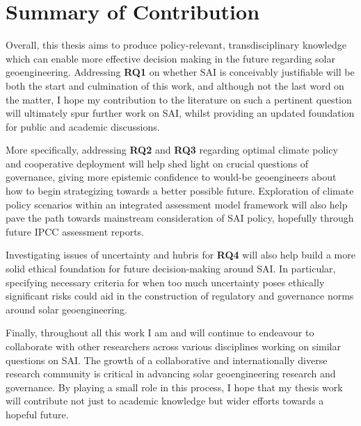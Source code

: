 \documentclass{article}
\begin{document}
\section*{Summary of Contribution}
Overall, this thesis aims to produce policy-relevant, transdisciplinary knowledge which can enable more effective decision making in the future regarding solar geoengineering. Addressing \textbf{RQ1} on whether SAI is conceivably justifiable will be both the start and culmination of this work, and although not the last word on the matter, I hope my contribution to the literature on such a pertinent question will ultimately spur further work on SAI, whilst providing an updated foundation for public and academic discussions. \medskip

More specifically, addressing \textbf{RQ2} and \textbf{RQ3} regarding optimal climate policy and cooperative deployment will help shed light on crucial questions of governance, giving more epistemic confidence to would-be geoengineers about how to begin strategizing towards a better possible future. Exploration of climate policy scenarios within an integrated assessment model framework will also help pave the path towards mainstream consideration of SAI policy, hopefully through future IPCC assessment reports. \medskip

Investigating issues of uncertainty and hubris for \textbf{RQ4} will also help build a more solid ethical foundation for future decision-making around SAI. In particular, specifying necessary criteria for when too much uncertainty poses ethically significant risks could aid in the construction of regulatory and governance norms around solar geoengineering. \medskip

Finally, throughout all this work I am and will continue to endeavour to collaborate with other researchers across various disciplines working on similar questions on SAI. The growth of a collaborative and internationally diverse research community is critical in advancing solar geoengineering research and governance. By playing a small role in this process, I hope that my thesis work will contribute not just to academic knowledge but wider efforts towards a hopeful future.

\clearpage



\end{document}
